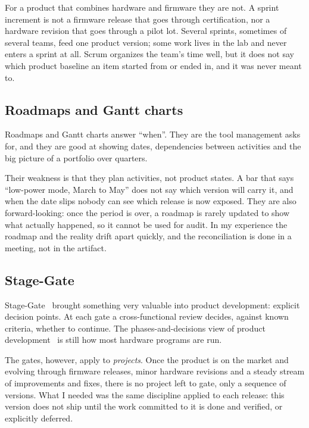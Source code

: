 For a product that combines hardware and firmware they are not. A sprint
increment is not a firmware release that goes through certification, nor a
hardware revision that goes through a pilot lot. Several sprints, sometimes
of several teams, feed one product version; some work lives in the lab and
never enters a sprint at all. Scrum organizes the team's time well, but it
does not say which product baseline an item started from or ended in, and
it was never meant to.

\subsection{Roadmaps and Gantt charts}
\label{sec:gaps-roadmaps}

Roadmaps and Gantt charts answer ``when''. They are the tool management
asks for, and they are good at showing dates, dependencies between
activities and the big picture of a portfolio over quarters.

Their weakness is that they plan activities, not product states. A bar
that says ``low-power mode, March to May'' does not say which version will
carry it, and when the date slips nobody can see which release is now
exposed. They are also forward-looking: once the period is over, a roadmap
is rarely updated to show what actually happened, so it cannot be used for
audit. In my experience the roadmap and the reality drift apart quickly,
and the reconciliation is done in a meeting, not in the artifact.

\subsection{Stage-Gate}
\label{sec:gaps-stagegate}

Stage-Gate~\citep{cooper1990stagegate} brought something very valuable
into product development: explicit decision points. At each gate a
cross-functional review decides, against known criteria, whether to
continue. The phases-and-decisions view of product
development~\citep{ulrich2016pdd} is still how most hardware programs are
run.

The gates, however, apply to \emph{projects}. Once the product is on the
market and evolving through firmware releases, minor hardware revisions
and a steady stream of improvements and fixes, there is no project left to
gate, only a sequence of versions. What I needed was the same discipline
applied to each release: this version does not ship until the work
committed to it is done and verified, or explicitly deferred.

